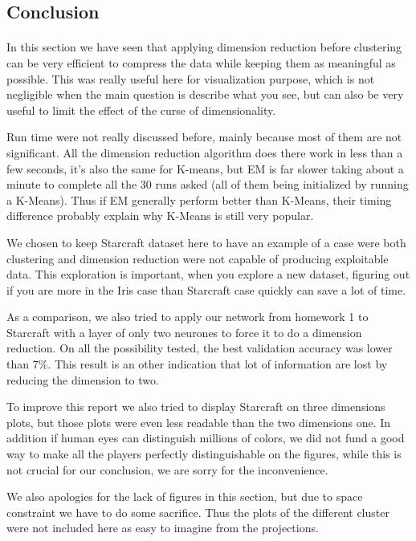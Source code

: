 \documentclass[twocolumn,a4paper,10pt]{article}
\begin{document}
\subsection{Conclusion}
\paragraph{}
In this section we have seen that applying dimension reduction before clustering can be very efficient to compress the data while keeping them as meaningful as possible. This was really useful here for visualization purpose, which is not negligible when the main question is describe what you see, but can also be very useful to limit the effect of the curse of dimensionality.

Run time were not really discussed before, mainly because most of them are not significant. All the dimension reduction algorithm does there work in less than a few seconds, it's also the same for K-means, but EM is far slower taking about a minute to complete all the 30 runs asked (all of them being initialized by running a K-Means). Thus if EM generally perform better than K-Means, their timing difference probably explain why K-Means is still very popular.

We chosen to keep Starcraft dataset here to have an example of a case were both clustering and dimension reduction were not capable of producing exploitable data. This exploration is important, when you explore a new dataset, figuring out if you are more in the Iris case than Starcraft case quickly can save a lot of time.

As a comparison, we also tried to apply our network from homework 1 to Starcraft with a layer of only two neurones to force it to do a dimension reduction. On all the possibility tested, the best validation accuracy was lower than 7\%. This result is an other indication that lot of information are lost by reducing the dimension to two.

To improve this report we also tried to display Starcraft on three dimensions plots, but those plots were even less readable than the two dimensions one. In addition if human eyes can distinguish millions of colors, we did not fund a good way to make all the players perfectly distinguishable on the figures, while this is not crucial for our conclusion, we are sorry for the inconvenience.

We also apologies for the lack of figures in this section, but due to space constraint we have to do some sacrifice. Thus the plots of the different cluster were not included here as easy to imagine from the projections.
\end{document}
